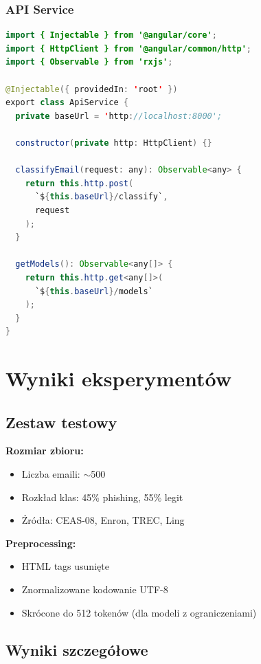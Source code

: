 \documentclass[11pt]{extreport}
\begin{document}
\subsection{API Service}

\begin{lstlisting}[language=Java, caption={Angular API Service}, label={lst:api-service}]
import { Injectable } from '@angular/core';
import { HttpClient } from '@angular/common/http';
import { Observable } from 'rxjs';

@Injectable({ providedIn: 'root' })
export class ApiService {
  private baseUrl = 'http://localhost:8000';
  
  constructor(private http: HttpClient) {}
  
  classifyEmail(request: any): Observable<any> {
    return this.http.post(
      `${this.baseUrl}/classify`, 
      request
    );
  }
  
  getModels(): Observable<any[]> {
    return this.http.get<any[]>(
      `${this.baseUrl}/models`
    );
  }
}
\end{lstlisting}

\chapter{Wyniki eksperymentów}
\label{ch:wyniki}

\section{Zestaw testowy}
\label{sec:zestaw-testowy}

\textbf{Rozmiar zbioru:}
\begin{itemize}
    \item Liczba emaili: $\sim$500
    \item Rozkład klas: 45\% phishing, 55\% legit
    \item Źródła: CEAS-08, Enron, TREC, Ling
\end{itemize}

\textbf{Preprocessing:}
\begin{itemize}
    \item HTML tags usunięte
    \item Znormalizowane kodowanie UTF-8
    \item Skrócone do 512 tokenów (dla modeli z ograniczeniami)
\end{itemize}

\section{Wyniki szczegółowe}
\label{sec:wyniki-szczegolowe}
\end{document}

